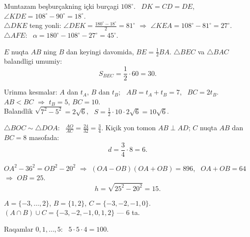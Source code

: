 Muntazam beşburçakning içki burçagi $108^\circ$. \ $DK=CD=DE$, \ $\angle KDE=108^\circ-90^\circ=18^\circ$.\\
$\triangle DKE$ teng yonli: $\angle DEK=\frac{180^\circ-18^\circ}2=81^\circ$ $\Rightarrow$ $\angle KEA=108^\circ-81^\circ=27^\circ$.\\
$\triangle AFE$: \ $\alpha=180^\circ-108^\circ-27^\circ=45^\circ$.

$E$ nuqta $AB$ ning $B$ dan keyingi davomida, $BE=\frac12BA$. $\triangle BEC$ va $\triangle BAC$ balandligi umumiy:
\[S_{BEC}=\frac12\cdot60=30.\]

Urinma kesmalar: $A$ dan $t_A$, $B$ dan $t_B$; \ $AB=t_A+t_B=7$, \ $BC=2t_B$. \ $AB<BC$ $\Rightarrow$ $t_B=5$, $BC=10$.\\
Balandlik $\sqrt{7^2-5^2}=2\sqrt6$, \ $S=\frac12\cdot10\cdot2\sqrt6=10\sqrt6$.

$\triangle BOC\sim\triangle DOA$: \ $\frac{AO}{AC}=\frac{24}{32}=\frac34$. Kiçik yon tomon $AB\perp AD$; $C$ nuqta $AB$ dan $BC=8$ masofada:
\[d=\frac34\cdot8=6.\]

$OA^2-36^2=OB^2-20^2$ $\Rightarrow$ $(OA-OB)(OA+OB)=896$, \ $OA+OB=64$ $\Rightarrow$ $OB=25$.
\[h=\sqrt{25^2-20^2}=15.\]

$A=\{-3,\dots,2\}$, $B=\{1,2\}$, $C=\{-3,-2,-1,0\}$. \ $(A\cap B)\cup C=\{-3,-2,-1,0,1,2\}$ — $6$ ta.

Raqamlar $0,1,\dots,5$: \ $5\cdot5\cdot4=100$.

